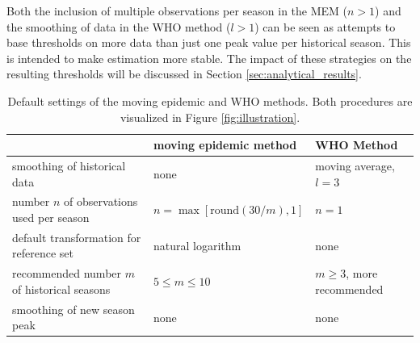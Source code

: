 \documentclass[12pt]{article}
\begin{document}
Both the inclusion of multiple observations per season in the MEM ($n > 1$) and the smoothing of data in the WHO method ($l > 1$) can be seen as attempts to base thresholds on more data than just one peak value per historical season. This is intended to make estimation more stable. The impact of these strategies on the resulting thresholds will be discussed in Section \ref{sec:analytical_results}.




\begin{table}[h]
\caption{Default settings of the moving epidemic and WHO methods. Both procedures are visualized in Figure \ref{fig:illustration}.}
\label{tab:differences}
\begin{center}
\footnotesize
\begin{tabular}{lll}
\toprule
& moving epidemic method & WHO Method \\
\midrule
smoothing of historical data & none & moving average, $l = 3$\\
number $n$ of observations used per season & $n = \max[\text{round}(30/m), 1]$ & $n = 1$\\
default transformation for reference set & natural logarithm & none\\
recommended number $m$ of historical seasons & $5 \leq m \leq 10$ & $m \geq 3$, more recommended\\
smoothing of new season peak & none & none\\
\bottomrule
\end{tabular}
\end{center}

\end{table}
\end{document}
